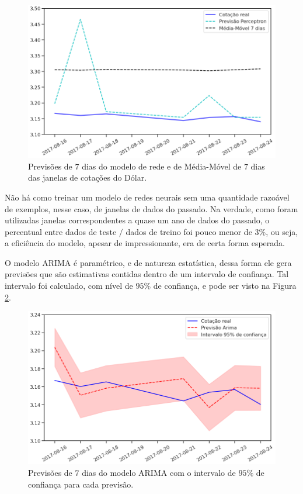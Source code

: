 \begin{figure}[htb]
\centering
\includegraphics[width=14cm]{figuras/series_previsoes_7_2}
\caption{Previsões de $7$ dias do modelo de rede  e de Média-Móvel de $7$ dias das janelas de cotações do Dólar.}
\label{fig:series_previsoes_7_2}
\end{figure}

Não há como treinar um modelo de redes neurais sem uma quantidade razoável de exemplos, nesse caso, de janelas de dados do passado. Na verdade, como foram utilizadas janelas correspondentes a quase um ano de dados do passado, o percentual entre dados de teste $/$ dados de treino foi pouco menor de $3\%$, ou seja, a eficiência do modelo, apesar de impressionante, era de certa forma esperada.

O modelo ARIMA é paramétrico, e de natureza estatística, dessa forma ele gera previsões que são estimativas contidas dentro de um intervalo de confiança. Tal intervalo foi calculado, com nível de $95\%$ de confiança, e pode ser visto na Figura \ref{fig:series_previsoes_7_3}.

\begin{figure}[htb]
\centering
\includegraphics[width=14cm]{figuras/series_previsoes_7_3}
\caption{Previsões de $7$ dias do modelo ARIMA com o intervalo de $95\%$ de confiança para cada previsão.}
\label{fig:series_previsoes_7_3}
\end{figure}


